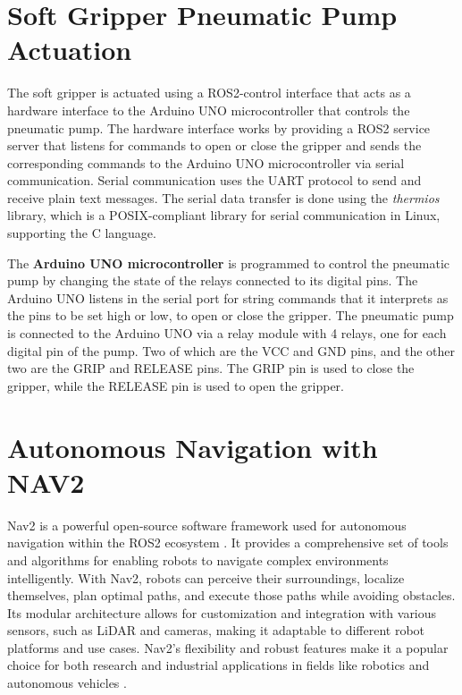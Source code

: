 \section{Soft Gripper Pneumatic Pump Actuation}

The soft gripper is actuated using a ROS2-control interface that acts as a hardware interface to the Arduino UNO
microcontroller that controls the pneumatic pump. The hardware interface works by providing a ROS2 service server that 
listens for commands to open or close the gripper and sends the corresponding commands to the Arduino UNO microcontroller
via serial communication. 
Serial communication uses the UART protocol to send and receive plain text messages.
The serial data transfer is done using the \textit{thermios} library, which is a POSIX-compliant library for serial
communication in Linux, supporting the C language.

The \textbf{Arduino UNO microcontroller} is programmed to control the pneumatic pump by changing
the state of the relays connected to its digital pins. The Arduino UNO listens in the serial port for string commands
that it interprets as the pins to be set high or low, to open or close the gripper. The pneumatic pump is connected
to the Arduino UNO via a relay module with 4 relays, one for each digital pin of the pump. Two of which
are the VCC and GND pins, and the other two are the GRIP and RELEASE pins. The GRIP pin is used to close the gripper,
while the RELEASE pin is used to open the gripper.

\section{Autonomous Navigation with NAV2}

Nav2 is a powerful open-source software framework used for autonomous navigation within the ROS2 ecosystem
\cite{macenski2020nav2}.
It provides a comprehensive set of tools and algorithms for enabling robots to navigate complex environments intelligently.
With Nav2, robots can perceive their surroundings, localize themselves, plan optimal paths, and execute 
those paths while avoiding obstacles. Its modular architecture allows for customization and integration with various sensors,
such as LiDAR and cameras, making it adaptable to different robot platforms and use cases. 
Nav2's flexibility and robust features make it a popular choice for both research and industrial applications 
in fields like robotics and autonomous vehicles
\cite{macenski2023survey}.

